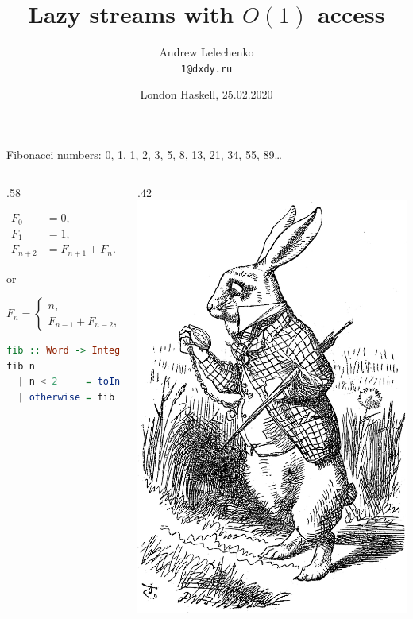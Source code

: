\documentclass[handout]{beamer}
\title{Lazy streams with $O(1)$ access}
\author[Andrew Lelechenko]{Andrew Lelechenko \\ \texttt{1@dxdy.ru}}
\institute[Barclays]{Barclays, London}
\date{London Haskell, 25.02.2020}
\def\fiboEq{
$$
F_n = \begin{cases}
n, & n < 2, \\
F_{n-1} + F_{n-2}, & \text{otherwise}.
\end{cases}
$$
}
\begin{document}
\begin{frame}
  \titlepage
\end{frame}

\begin{frame}[fragile]{Fibonacci numbers: 0, 1, 1, 2, 3, 5, 8, 13, 21, 34, 55, 89\dots}

\begin{columns}[T]
  \begin{column}{.58\textwidth}

\begin{align*}
F_0 &= 0, \\
F_1 &= 1, \\
F_{n+2} &= F_{n+1} + F_n.
\end{align*}

or

\fiboEq

\begin{lstlisting}[language=Haskell]
fib :: Word -> Integer
fib n
  | n < 2     = toInteger n
  | otherwise = fib (n - 1) + fib (n - 2)
\end{lstlisting}

\end{column}

\begin{column}{.42\textwidth}
  \includegraphics[width=\textwidth]{white-rabbit.png}
\end{column}


\end{columns}
\end{frame}
\end{document}
